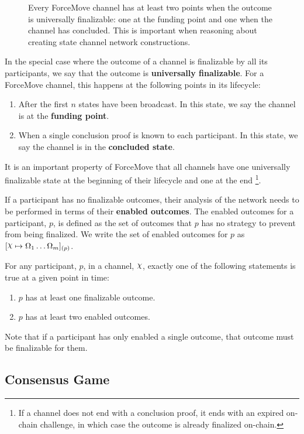 \begin{figure}[h]\centering
  \makebox[\textwidth][c]{}
  \caption{
    Every ForceMove channel has at least two points when the outcome is universally finalizable: one at the funding point and one when the channel has concluded.
    This is important when reasoning about creating state channel network constructions.
  }
\end{figure}
In the special case where the outcome of a channel is finalizable by all its participants, we say that the outcome is \textbf{universally finalizable}.
For a ForceMove channel, this happens at the following points in its lifecycle:
\begin{enumerate}
  \item After the first $n$ states have been broadcast. In this state, we say the channel is at the \textbf{funding point}.
  \item When a single conclusion proof is known to each participant. In this state, we say the channel is in the \textbf{concluded state}.
\end{enumerate}
It is an important property of ForceMove that all channels have one universally finalizable
state at the beginning of their lifecycle and one at the end
\footnote{If a channel does not end with a conclusion proof, it ends with an expired on-chain challenge,
in which case the outcome is already finalized on-chain.}.

If a participant has no finalizable outcomes, their analysis of the network needs to be performed
in terms of their \textbf{enabled outcomes}.
The enabled outcomes for a participant, $p$, is defined as the set of outcomes that $p$ has
no strategy to prevent from being finalized.
We write the set of enabled outcomes for $p$ as $\finalizable{\rchi}{\Omega_1 \dots \Omega_m}{(p)}$.

For any participant, $p$, in a channel, $\rchi$, exactly one of the following statements is
true at a given point in time:
\begin{enumerate}
  \item $p$ has at least one finalizable outcome.
  \item $p$ has at least two enabled outcomes.
\end{enumerate}
Note that if a participant has only enabled a single outcome, that outcome must be finalizable for them.

\subsection{Consensus Game}

